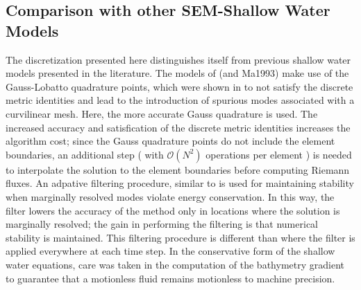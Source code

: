 \documentclass{softwaremanual}
\begin{document}
\subsection{Comparison with other SEM-Shallow Water Models}
The discretization presented here distinguishes itself from previous shallow water models presented in the literature. The models of \citet{Iskandarani1995} (and Ma1993) make use of the Gauss-Lobatto quadrature points, which were shown in \citet{Kopriva2006} to not satisfy the discrete metric identities and lead to the introduction of spurious modes associated with a curvilinear mesh. Here, the more accurate Gauss quadrature is used. The increased accuracy and satisfication of the discrete metric identities increases the algorithm cost; since the Gauss quadrature points do not include the element boundaries, an additional step ( with $\mathcal{O}(N^2)$ operations per element ) is needed to interpolate the solution to the element boundaries before computing Riemann fluxes. An adpative filtering procedure, similar to \citet{Flad2016} is used for maintaining stability when marginally resolved modes violate energy conservation. In this way, the filter lowers the accuracy of the method only in locations where the solution is marginally resolved; the gain in performing the filtering is that numerical stability is maintained. This filtering procedure is different than \citet{Taylor1997} where the filter is applied everywhere at each time step. In the conservative form of the shallow water equations, care was taken in the computation of the bathymetry gradient to guarantee that a motionless fluid remains motionless to machine precision.


\end{document}

